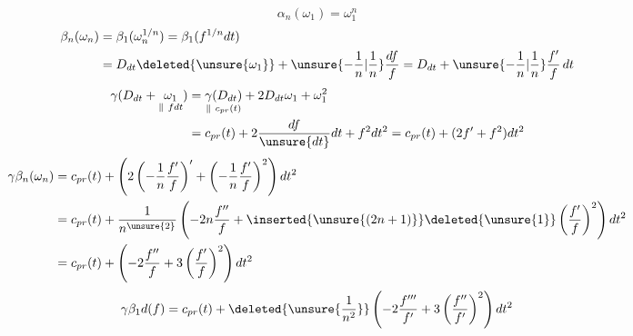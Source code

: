 \[
\alpha_n(\omega_1)=\omega_1^n
\]
\[
\begin{aligned}
\beta_n(\omega_n)&=\beta_1(\omega_n^{1/n})
=\beta_1(f^{1/n}dt)\\
&=D_{dt}\deleted{\unsure{\omega_1}}
+\unsure{-\frac1n|\frac1n}\frac{df}{f}
=D_{dt}+\unsure{-\frac1n|\frac1n}\frac{f'}f\,dt
\end{aligned}
\]
\[
\begin{aligned}
\gamma(D_{dt}+\underset{\Vert\ fdt}{\omega_1})
&=\underset{\Vert\ c_{pr}(t)}{\gamma(D_{dt})}
+2D_{dt}\omega_1+\omega_1^2\\
&=c_{pr}(t)+2\frac{df}{\unsure{dt}}dt+f^2dt^2
=c_{pr}(t)+(2f'+f^2)dt^2
\end{aligned}
\]
\[
\begin{aligned}
\gamma\beta_n(\omega_n)
&=c_{pr}(t)+\left(2\left(-\frac1n\frac{f'}f\right)'
+\left(-\frac1n\frac{f'}f\right)^2\right)dt^2\\
&=c_{pr}(t)+\frac1{n^{\unsure{2}}}
\left(-2n\frac{f''}f+\inserted{\unsure{(2n+1)}}
\deleted{\unsure{1}}\left(\frac{f'}f\right)^2\right)dt^2\\
&=c_{pr}(t)+\left(-2\frac{f''}f+3\left(\frac{f'}f\right)^2\right)dt^2
\end{aligned}
\]
\[
\gamma\beta_1d(f)=c_{pr}(t)+\deleted{\unsure{\frac1{n^2}}}
\left(-2\frac{f'''}{f'}+3\left(\frac{f''}{f'}\right)^2\right)dt^2
\]
\margin{\[
\begin{aligned}
\delta(\omega_2)&=\gamma\beta_2(\omega_2)+\omega_2\\
&=c_{pr}(\unsure{t|\omega_1})+
\left[f-\unsure{\frac{f''}f|2\frac{f''}f}+\frac54\left(\frac{f'}f\right)^2\right]dt^2\\
\delta\alpha'_2(\omega_1)&=\gamma\beta_1(\omega_1)
\deleted{\unsure{^{2}}}+\omega_1^{\unsure{2|1}}\\
&=c_{pr}(t)+\left[f^2-2\frac{f''}f+3\left(\frac{f'}f\right)^2\right]dt^2
\end{aligned}
\]}

